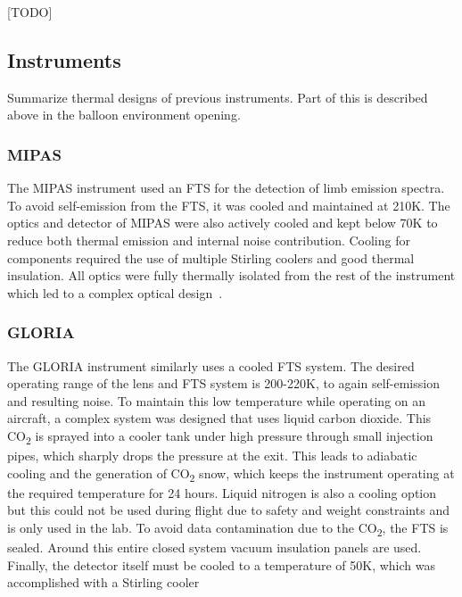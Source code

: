 [TODO]

\subsection{Instruments} \label{GLORIA_MIPAS_thermal}
Summarize thermal designs of previous instruments. Part of this is described above in the balloon environment opening.

\subsubsection{MIPAS}
The MIPAS instrument used an FTS for the detection of limb emission spectra. To avoid self-emission from the FTS, it was cooled and maintained at 210K. The optics and detector of MIPAS were also actively cooled and kept below 70K to reduce both thermal emission and internal noise contribution. Cooling for components required the use of multiple Stirling coolers and good thermal insulation. All optics were fully thermally isolated from the rest of the instrument which led to a complex optical design~\citep{MIPAS_instrument}.

\subsubsection{GLORIA}
The GLORIA instrument similarly uses a cooled FTS system. The desired operating range of the lens and FTS system is 200-220K, to again self-emission and resulting noise. To maintain this low temperature while operating on an aircraft, a complex system was designed that uses liquid carbon dioxide. This CO\textsubscript{2} is sprayed into a cooler tank under high pressure through small injection pipes, which sharply drops the pressure at the exit. This leads to adiabatic cooling and the generation of CO\textsubscript{2} snow, which keeps the instrument operating at the required temperature for 24 hours. Liquid nitrogen is also a cooling option but this could not be used during flight due to safety and weight constraints and is only used in the lab. To avoid data contamination due to the CO\textsubscript{2}, the FTS is sealed. Around this entire closed system vacuum insulation panels are used. Finally, the detector itself must be cooled to a temperature of 50K, which was accomplished with a Stirling cooler~\citep{GLORIA_concept}~\citep{GLORIA_thermalmech}

